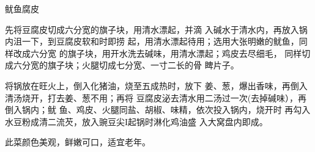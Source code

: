 \begin{recipe}{鱿鱼腐皮}

\ingredients



\cooking

\step 	先将豆腐皮切成六分宽的旗子块，用清水漂起，并滴 入碱水于清水内，再放入锅内沮一下，到豆腐皮软和时即捞 起，用清水漂起待用；选用大张明嫩的鱿鱼，同样改成六分宽 的旗子块，用开水洗去碱味，用清水漂起；鸡皮去尽细毛， 同样切成六分宽的旗子块；火腿切成七分宽、一寸二长的骨 睥片子。

\step 	将锅放在旺火上，倒入化猪油，烧至五成热时，放下 姜、葱，爆出香味，再倒入清汤烧开，打去姜、葱不用；再将 豆腐皮泌去清水用二汤过一次(去掉碱味），再倒入锅内；鱿 鱼、鸡皮、火腿同盐、胡椒、味精，依次投入锅内，烧开时 再勾入水豆粉成清二流芡，放入豌豆尖I起锅时淋化鸡油盛 入大窝盘内即成。

\notes

此菜颜色美观，鲜嫩可口，适宜老年。

\end{recipe}

